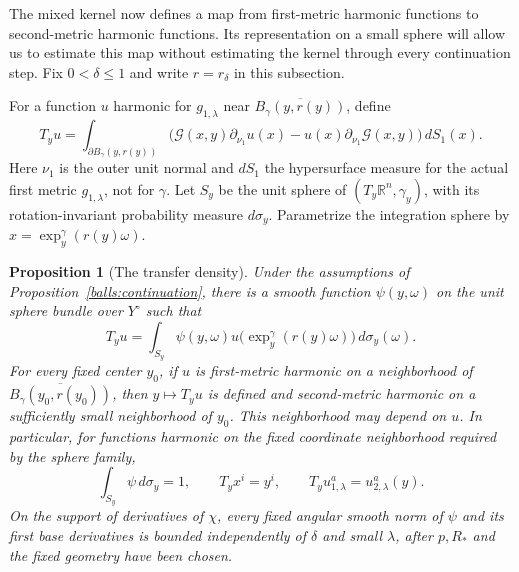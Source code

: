 \documentclass[11pt]{article}
\newtheorem{proposition}[theorem]{Proposition}
\theoremstyle{definition}
\theoremstyle{remark}
\numberwithin{equation}{section}
\begin{document}
The mixed kernel now defines a map from first-metric harmonic functions
to second-metric harmonic functions.  Its representation on a small
sphere will allow us to estimate this map without estimating the kernel
through every continuation step.
Fix $0<\delta\le1$ and write $r=r_\delta$ in this subsection.

For a function $u$ harmonic for $g_{1,\lambda}$ near
$\overline{B_\gamma(y,r(y))}$, define
\begin{equation}\label{balls:flux}
 T_yu=\int_{\partial B_\gamma(y,r(y))}
  \bigl(\mathcal G(x,y)\partial_{\nu_1}u(x)
       -u(x)\partial_{\nu_1}\mathcal G(x,y)\bigr)\,dS_1(x).
\end{equation}
Here $\nu_1$ is the outer unit normal and $dS_1$ the hypersurface measure
for the actual first metric $g_{1,\lambda}$, not for $\gamma$.
Let $S_y$ be the unit sphere of $(T_y\mathbb R^n,\gamma_y)$, with its
rotation-invariant probability measure $d\sigma_y$.  Parametrize the
integration sphere by $x=\exp_y^\gamma(r(y)\omega)$.

\begin{proposition}[The transfer density]\label{balls:functional}
Under the assumptions of Proposition~\ref{balls:continuation}, there is
a smooth function $\psi(y,\omega)$ on the unit sphere bundle over
$Y^\circ$ such that
\begin{equation}\label{balls:density-representation}
 T_yu=\int_{S_y}\psi(y,\omega)
              u\bigl(\exp_y^\gamma(r(y)\omega)\bigr)\,d\sigma_y(\omega).
\end{equation}
For every fixed center $y_0$, if $u$ is first-metric harmonic on a
neighborhood of $\overline{B_\gamma(y_0,r(y_0))}$, then
$y\mapsto T_yu$ is defined and second-metric harmonic on a sufficiently
small neighborhood of $y_0$.  This neighborhood may depend on $u$.
In particular, for functions harmonic on the fixed coordinate
neighborhood required by the sphere family,
\begin{equation}\label{balls:reproduction}
 \int_{S_y}\psi\,d\sigma_y=1,
 \qquad T_yx^i=y^i,
 \qquad T_yu_{1,\lambda}^a=u_{2,\lambda}^a(y).
\end{equation}
On the support of derivatives of $\chi$, every fixed angular smooth
norm of $\psi$ and its first base derivatives is bounded independently
of $\delta$ and small $\lambda$, after $p,R_*$ and the fixed geometry
have been chosen.
\end{proposition}
\end{document}
